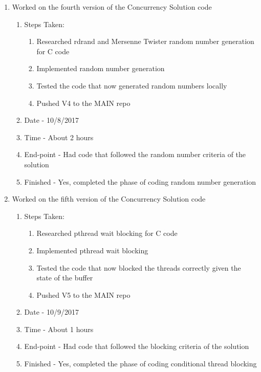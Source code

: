 \documentclass[letterpaper,10pt,fleqn]{article}
\begin{document}
\begin{enumerate}
	\item Worked on the fourth version of the Concurrency Solution code
		\begin{enumerate}
			\item Steps Taken:
				\begin{enumerate}
					\item Researched rdrand and Mersenne Twister random number generation for C code
					\item Implemented random number generation
					\item Tested the code that now generated random numbers locally
					\item Pushed V4 to the MAIN repo
				\end{enumerate}
			\item Date - 10/8/2017
			\item Time - About 2 hours
			\item End-point - Had code that followed the random number criteria of the solution
			\item Finished - Yes, completed the phase of coding random number generation
		\end {enumerate}
		
	\item Worked on the fifth version of the Concurrency Solution code
		\begin{enumerate}
			\item Steps Taken:
				\begin{enumerate}
					\item Researched pthread wait blocking for C code
					\item Implemented pthread wait blocking
					\item Tested the code that now blocked the threads correctly given the state of the buffer
					\item Pushed V5 to the MAIN repo
				\end{enumerate}
			\item Date - 10/9/2017
			\item Time - About 1 hours
			\item End-point - Had code that followed the blocking criteria of the solution
			\item Finished - Yes, completed the phase of coding conditional thread blocking
		\end {enumerate}
        \end{enumerate}
		
\end{document}
